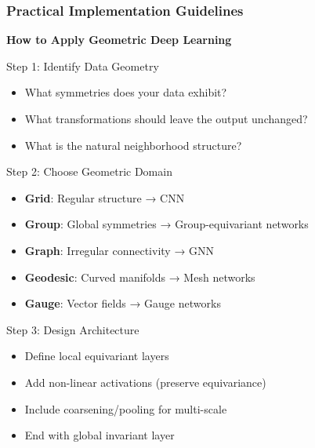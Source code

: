 \begin{frame}[fragile]\frametitle{Practical Implementation Guidelines}

\begin{center}
\textbf{How to Apply Geometric Deep Learning}
\end{center}

\begin{block}{Step 1: Identify Data Geometry}
\begin{itemize}
\item What symmetries does your data exhibit?
\item What transformations should leave the output unchanged?
\item What is the natural neighborhood structure?
\end{itemize}
\end{block}

\begin{block}{Step 2: Choose Geometric Domain}
\begin{itemize}
\item \textbf{Grid}: Regular structure → CNN
\item \textbf{Group}: Global symmetries → Group-equivariant networks
\item \textbf{Graph}: Irregular connectivity → GNN
\item \textbf{Geodesic}: Curved manifolds → Mesh networks
\item \textbf{Gauge}: Vector fields → Gauge networks
\end{itemize}
\end{block}

\begin{block}{Step 3: Design Architecture}
\begin{itemize}
\item Define local equivariant layers
\item Add non-linear activations (preserve equivariance)
\item Include coarsening/pooling for multi-scale
\item End with global invariant layer
\end{itemize}
\end{block}

\end{frame}

